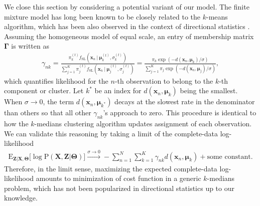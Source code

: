 \documentclass[10pt]{article}
\newcommand{\bfx}{\mathbf{x}}
\newcommand{\bfmu}{\boldsymbol{\mu}}
\newcommand{\bfX}{\mathbf{X}}
\newcommand{\bfZ}{\mathbf{Z}}
\newcommand{\bfTheta}{\mathbf{\Theta}}
\newcommand{\bfGamma}{\mathbf{\Gamma}}
\newcommand{\rmE}{\textrm{E}}
\newcommand{\rmP}{\textrm{P}}
\newcommand{\fSL}{f_{\textrm{SL}}}
\begin{document}
We close this section by considering a potential variant of our model. The finite mixture model has long been known to be closely related to the $k$-means algorithm, which has been also observed in the context of directional statistics  \cite{dhillon_2001_ConceptDecompositionsLarge, banerjee_2005_ClusteringUnitHypersphere, bishop_2006_PatternRecognitionMachine}. Assuming the homogeneous model of equal scale, an entry of membership matrix $\bfGamma$ is written as 
\begin{eqnarray}
\gamma_{nk} = \frac{\pi_k^{(t)} \fSL(\bfx_n~|~\bfmu_k^{(t)}, \sigma_k^{(t)})}{\sum_{j=1}^K \pi_j^{(t)} \fSL(\bfx_n~|~\bfmu_j^{(t)}, \sigma_j^{(t)})} = 
\frac{\pi_k \exp \left( -{d(\bfx_n, \bfmu_k)}/{\sigma} \right) }{\sum_{j=1}^K \pi_j \exp \left( -{d(\bfx_n, \bfmu_j)}/{\sigma} \right)},
\end{eqnarray}
which quantifies likelihood for the $n$-th observation to belong to the $k$-th component or cluster. Let $k^*$ be an index for $d(\bfx_n, \bfmu_k)$ being the smallest. When $\sigma \rightarrow 0$, the term $d(\bfx_n, \bfmu_{k^*})$ decays at the slowest rate in the denominator than others so that all other $\gamma_{nk}$'s approach to zero. This procedure is identical to how the $k$-medians clustering algorithm updates assignment of each observation. We can validate this reasoning by taking a limit of the complete-data log-likelihood
\begin{eqnarray}
\rmE_{\bfZ|\bfX, \bfTheta} \lbrack \log \rmP(\bfX,\bfZ|\bfTheta) \rbrack  \xrightarrow{\sigma \rightarrow 0} - \sum_{n=1}^N \sum_{k=1}^K \gamma_{nk} d(\bfx_n, \bfmu_k) + \textrm{some constant}.
\end{eqnarray}
Therefore, in the limit sense, maximizing the expected complete-data log-likelihood amounts to minimization of cost function in a generic $k$-medians problem, which has not been popularized in directional statistics up to our knowledge. 
\end{document}
